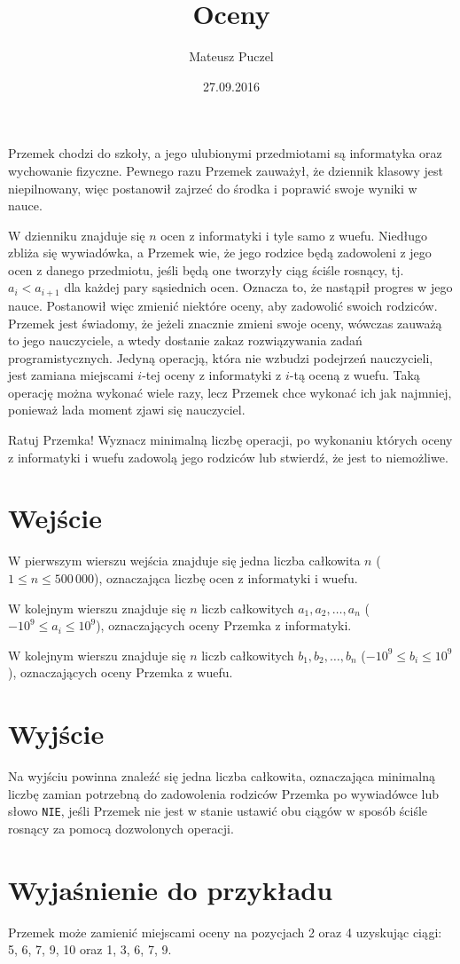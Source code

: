 \documentclass[zad,zawodnik,utf8]{sinol}
\title{Oceny}
\author{Mateusz Puczel} %
\date{27.09.2016}
\begin{document}
\begin{tasktext}%
Przemek chodzi do szkoły, a jego ulubionymi przedmiotami są informatyka oraz wychowanie fizyczne. Pewnego razu Przemek zauważył, że dziennik klasowy
jest niepilnowany, więc postanowił zajrzeć do środka i poprawić swoje wyniki w nauce.

W dzienniku znajduje się $n$ ocen z informatyki i tyle samo z wuefu. Niedługo zbliża się wywiadówka, a Przemek wie, że jego rodzice
będą zadowoleni z jego ocen z danego przedmiotu, jeśli będą one tworzyły ciąg ściśle rosnący, tj. $a_i < a_{i + 1}$ dla każdej pary sąsiednich ocen.
Oznacza to, że nastąpił progres w jego nauce.
Postanowił więc zmienić niektóre oceny, aby zadowolić swoich rodziców. Przemek jest świadomy, że jeżeli znacznie zmieni swoje oceny, wówczas zauważą
to jego nauczyciele, a wtedy dostanie zakaz rozwiązywania zadań programistycznych. Jedyną operacją, która nie wzbudzi podejrzeń nauczycieli, jest zamiana
miejscami $i$-tej oceny z informatyki z $i$-tą oceną z wuefu. Taką operację można wykonać wiele razy, lecz Przemek chce wykonać ich jak najmniej, ponieważ
lada moment zjawi się nauczyciel.

Ratuj Przemka! Wyznacz minimalną liczbę operacji, po wykonaniu których oceny z informatyki i wuefu zadowolą jego rodziców lub stwierdź, że jest to niemożliwe.

  \section{Wejście}
W pierwszym wierszu wejścia znajduje się jedna liczba całkowita $n$ ($1 \leq n \leq 500\,000$), oznaczająca liczbę ocen z informatyki i wuefu.

W kolejnym wierszu znajduje się $n$ liczb całkowitych $a_1, a_2, \dots, a_n$ ($-10^9 \leq a_i \leq 10^9$), oznaczających oceny Przemka z informatyki.

W kolejnym wierszu znajduje się $n$ liczb całkowitych $b_1, b_2, \dots, b_n$ ($-10^9 \leq b_i \leq 10^9$), oznaczających oceny Przemka z wuefu.

  \section{Wyjście}
Na wyjściu powinna znaleźć się jedna liczba całkowita, oznaczająca minimalną liczbę zamian potrzebną do zadowolenia rodziców Przemka po wywiadówce
lub słowo \texttt{NIE}, jeśli Przemek nie jest w stanie ustawić obu ciągów w sposób ściśle rosnący za pomocą dozwolonych operacji.


  \section{Wyjaśnienie do przykładu}
Przemek może zamienić miejscami oceny na pozycjach 2 oraz 4 uzyskując ciągi: 5, 6, 7, 9, 10 oraz 1, 3, 6, 7, 9. 

\end{tasktext}
\end{document}
